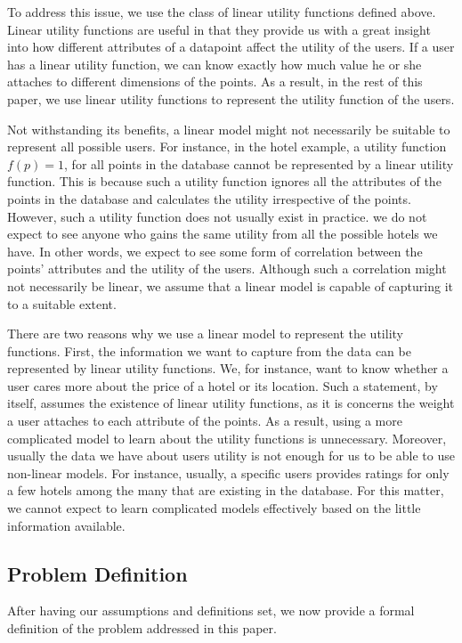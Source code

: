 To address this issue, we use the class of linear utility functions defined above. Linear utility functions are useful in that they provide us with a great insight into how different attributes of a datapoint affect the utility of the users. If a user has a linear utility function, we can know exactly how much value he or she attaches to different dimensions of the points. As a result, in the rest of this paper, we use linear utility functions to represent the utility function of the users.

Not withstanding its benefits, a linear model might not necessarily be suitable to represent all possible users. For instance, in the hotel example, a utility function $f(p) = 1$, for all points in the database cannot be represented by a linear utility function. This is because such a utility function ignores all the attributes of the points in the database and calculates the utility irrespective of the points. However, such a utility function does not usually exist in practice. we do not expect to see anyone who gains the same utility from all the possible hotels we have. In other words, we expect to see some form of correlation between the points' attributes and the utility of the users. Although such a correlation might not necessarily be linear, we assume that a linear model is capable of capturing it to a suitable extent. 

There are two reasons why we use a linear model to represent the utility functions. First, the information we want to capture from the data can be represented by linear utility functions. We, for instance, want to know whether a user cares more about the price of a hotel or its location. Such a statement, by itself, assumes the existence of linear utility functions, as it is concerns the weight a user attaches to each attribute of the points. As a result, using a more complicated model to learn about the utility functions is unnecessary. Moreover, usually the data we have about users utility is not enough for us to be able to use non-linear models. For instance, usually, a specific users provides ratings for only a few hotels among the many that are existing in the database. For this matter, we cannot expect to learn complicated models effectively based on the little information available. 

\subsection{Problem Definition}
After having our assumptions and definitions set, we now provide a formal definition of the problem addressed in this paper.

